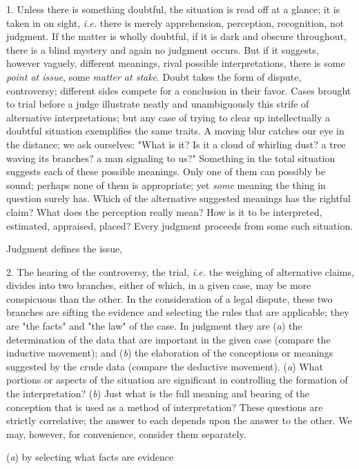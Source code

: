 \documentclass[letterpaper]{book}
\begin{document}
1. Unless there is something doubtful, the situation is read off at a
glance; it is taken in on sight, \emph{i.e.} there is merely
apprehension, perception, recognition, not judgment. If the matter is
wholly doubtful, if it is dark and obscure throughout, there is a blind
mystery and again no judgment occurs. But if it suggests, however
vaguely, different meanings, rival possible interpretations, there is
some \emph{point at issue}, some \emph{matter at stake}. Doubt takes the
form of dispute, controversy; different sides compete for a conclusion
in their favor. Cases brought to trial before a judge illustrate neatly
and unambiguously this strife of alternative interpretations; but any
case of trying to clear up intellectually a doubtful situation
exemplifies the same traits. A moving blur catches our eye in the
distance; we ask ourselves: "What is it? Is it a cloud of whirling dust?
a tree waving its branches? a man signaling to us?" Something in the
total situation suggests each of these possible meanings. Only one of
them can possibly be sound; perhaps none of them is appropriate; yet
\emph{some} meaning the thing in question surely has. Which of the
alternative suggested meanings has the rightful claim? What does the
perception really mean? How is it to be interpreted, estimated,
appraised, placed? Every judgment proceeds from some such situation.

Judgment defines the issue,

2. The hearing of the controversy, the trial, \emph{i.e.} the weighing
of alternative claims, divides into two branches, either of which, in a
given case, may be more conspicuous than the other. In the consideration
of a legal dispute, these two branches are sifting the evidence
and
selecting the rules that are applicable; they are "the facts" and "the
law" of the case. In judgment they are (\emph{a}) the determination of
the data that are important in the given case (compare the inductive
movement); and (\emph{b}) the elaboration of the conceptions or meanings
suggested by the crude data (compare the deductive movement). (\emph{a})
What portions or aspects of the situation are significant in controlling
the formation of the interpretation? (\emph{b}) Just what is the full
meaning and bearing of the conception that is used as a method of
interpretation? These questions are strictly correlative; the answer to
each depends upon the answer to the other. We may, however, for
convenience, consider them separately.

(\emph{a}) by selecting what facts are evidence
\end{document}
